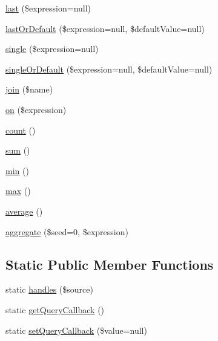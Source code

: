 \begin{DoxyCompactItemize}
\item 
\hyperlink{class_p_h_p_linq___linq_to_zend_db_a473a30c27001f1edc74b1b94f481c8d7}{last} (\$expression=null)
\item 
\hyperlink{class_p_h_p_linq___linq_to_zend_db_a87a27c9a37068fdadedb4d026eba831a}{last\-Or\-Default} (\$expression=null, \$default\-Value=null)
\item 
\hyperlink{class_p_h_p_linq___linq_to_zend_db_ab32beb141f7ae12ac580c8c1b0506390}{single} (\$expression=null)
\item 
\hyperlink{class_p_h_p_linq___linq_to_zend_db_a204daca32909a6031584dcd308be29e0}{single\-Or\-Default} (\$expression=null, \$default\-Value=null)
\item 
\hyperlink{class_p_h_p_linq___linq_to_zend_db_a1ac24d63648701a6876a2eb91f03900d}{join} (\$name)
\item 
\hyperlink{class_p_h_p_linq___linq_to_zend_db_a000230305e785b77bb55704d625d103b}{on} (\$expression)
\item 
\hyperlink{class_p_h_p_linq___linq_to_zend_db_ac751e87b3d4c4bf2feb03bee8b092755}{count} ()
\item 
\hyperlink{class_p_h_p_linq___linq_to_zend_db_adce2d1b0fc342d86c949a3588b78ebe6}{sum} ()
\item 
\hyperlink{class_p_h_p_linq___linq_to_zend_db_a0bb962b33915e2c1a507e95798a453a6}{min} ()
\item 
\hyperlink{class_p_h_p_linq___linq_to_zend_db_aa53a1564d7748b63ad507d7136c852fb}{max} ()
\item 
\hyperlink{class_p_h_p_linq___linq_to_zend_db_a8fa5690da6dbfe97e5f2ebfda9dc997f}{average} ()
\item 
\hyperlink{class_p_h_p_linq___linq_to_zend_db_a6b6ca639b69217bb6d4f12a8a3fcbf44}{aggregate} (\$seed=0, \$expression)
\end{DoxyCompactItemize}
\subsection*{\-Static \-Public \-Member \-Functions}
\begin{DoxyCompactItemize}
\item 
static \hyperlink{class_p_h_p_linq___linq_to_zend_db_a9cac44c1999a5e76809136f13aa20639}{handles} (\$source)
\item 
static \hyperlink{class_p_h_p_linq___linq_to_zend_db_afd6202bc9d83e033c0778cc759c7df8f}{get\-Query\-Callback} ()
\item 
static \hyperlink{class_p_h_p_linq___linq_to_zend_db_a8f8f80988f3b05d0ef7590b6c28e2d8a}{set\-Query\-Callback} (\$value=null)
\end{DoxyCompactItemize}
